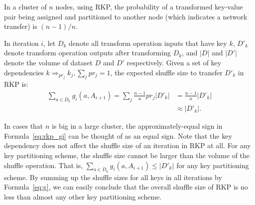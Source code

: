 \documentclass[10pt,journal,compsoc]{IEEEtran}
\begin{document}
In a cluster of $n$ nodes, using RKP, the probability of a transformed
key-value pair being assigned and partitioned to another node (which
indicates a network transfer) is $(n-1)/n$.

In iteration $i$, let $D_{k}$ denote all transform operation inputs that have key $k$, $D'_{k}$
denote transform operation outputs after transforming $D_{k}$, 
and $|D|$ and $|D'|$ denote the volume of dataset $D$ and $D'$
respectively. 
Given a set of key dependencies $k \Rightarrow_{pr_j} k_j, \sum_j pr_j = 1$, 
the expected shuffle size to transfer $D'_k$ in RKP is:
\begin{equation}\label{eq:rkp_gi}
\begin{aligned}
\sum_{a \in D_k} g_i(a, A_{i+1}) = \sum_j \frac{n-1}{n} pr_j  |D'_{k}| 
&= \frac{n-1}{n} |D'_{k}|\\
&\approx |D'_{k}|.
\end{aligned}
\end{equation}

In cases that $n$ is big in a large cluster, the approximately-equal sign
in Formula~\ref{eq:rkp_gi} can be thought of as an equal sign. 
Note that the key dependency does not affect the shuffle size of an iteration in RKP at all. 
For any key partitioning scheme, the shuffle size cannot be larger than 
the volume of the shuffle operation. 
That is, $\sum_{a \in D_k} g_i(a, A_{i+1}) \leq |D'_k|$ for any key partitioning scheme.
By summing up the shuffle sizes for all keys in all iterations by Formula~\ref{eq:g},
we can easily conclude that
the overall shuffle size of RKP is no less than almost any other key partitioning scheme. 

\end{document}
